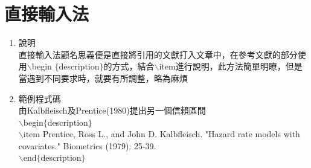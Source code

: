 \section{直接輸入法}
\begin{enumerate}
\item 說明\\
直接輸入法顧名思義便是直接將引用的文獻打入文章中，在參考文獻的部分使用$\backslash$begin $\{$description$\}$的方式，結合$\backslash$item進行說明，此方法簡單明瞭，但是當遇到不同要求時，就要有所調整，略為麻煩
\item 範例程式碼\\

由Kalbfleisch及Prentice(1980)提出另一個信賴區間\\
$\backslash$begin$\{$description$\}$\\
$\backslash$item Prentice, Ross L., and John D. Kalbfleisch. "Hazard rate models with covariates." Biometrics (1979): 25-39.\\
$\backslash$end$\{$description$\}$\\

\end{enumerate}
